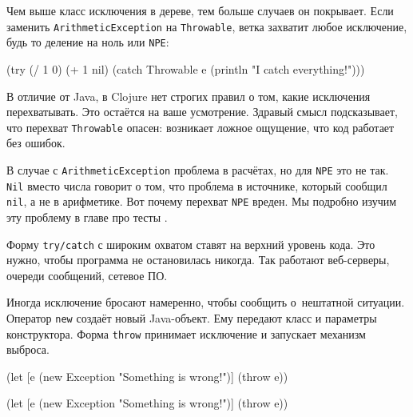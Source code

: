 
Чем выше класс исключения в дереве, тем больше случаев он покрывает. Если
заменить \verb|ArithmeticException| на \verb|Throwable|, ветка захватит
любое исключение, будь то деление на ноль или \verb|NPE|:

\begin{english}
  \begin{clojure}
(try
  (/ 1 0)
  (+ 1 nil)
  (catch Throwable e
    (println "I catch everything!")))
  \end{clojure}
\end{english}

В отличие от Java, в Clojure нет строгих правил о том, какие исключения
перехватывать. Это остаётся на ваше усмотрение. Здравый смысл подсказывает, что
перехват \verb|Throwable| опасен: возникает ложное ощущение, что код работает
без ошибок.

В случае с \verb|ArithmeticException| проблема в расчётах, но для \verb|NPE|
это не так. \verb|Nil| вместо числа говорит о том, что проблема в источнике,
который сообщил \verb|nil|, а не в арифметике. Вот почему перехват
\verb|NPE| вреден. Мы подробно изучим эту проблему в главе про
тесты .

Форму \verb|try/catch| с широким охватом ставят на верхний уровень кода. Это
нужно, чтобы программа не остановилась никогда. Так работают веб-серверы,
очереди сообщений, сетевое ПО.


Иногда исключение бросают намеренно, чтобы сообщить о~нештатной
ситуации. Оператор \verb|new| создаёт новый Java-объект. Ему передают класс и
параметры конструктора. Форма \verb|throw| принимает исключение и запускает
механизм выброса.

\ifx\devicetype\mobile

\begin{english}
  \begin{clojure}
(let [e (new Exception
          "Something is wrong!")]
  (throw e))
  \end{clojure}
\end{english}

\else

\begin{english}
  \begin{clojure}
(let [e (new Exception "Something is wrong!")]
  (throw e))
  \end{clojure}
\end{english}

